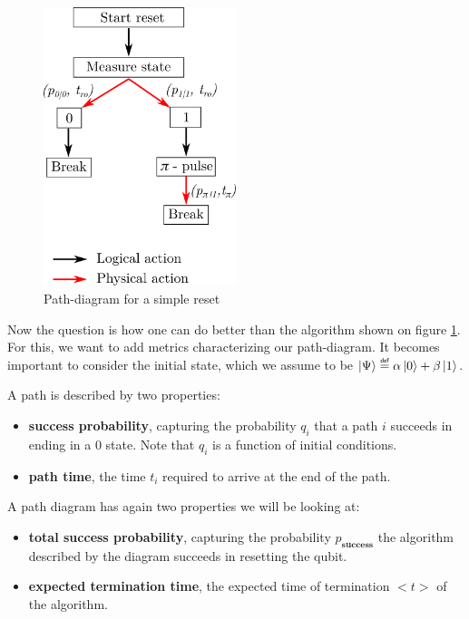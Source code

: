\begin{figure}[h]
    \centering
    \includegraphics[width=0.5\textwidth]{pic/algorithmic_reset/finite_branching.png}
    \caption{Path-diagram for a simple reset}
    \label{fig:finite_branching}
\end{figure}

Now the question is how one can do better than the algorithm shown on figure \ref{fig:finite_branching}. For this, we want to add metrics characterizing our path-diagram. It becomes important to consider the initial state, which we assume to be $\ket{\Psi} \eqdef \alpha\ket{0} + \beta \ket{1}$.

A path is described by two properties:
\begin{itemize}
    \item \textbf{success probability}, capturing the probability $q_i$ that a path $i$ succeeds in ending in a 0 state. Note that $q_i$ is a function of initial conditions.
    \item \textbf{path time}, the time $t_i$ required to arrive at the end of the path.
\end{itemize}

A path diagram has again two properties we will be looking at: 
\begin{itemize}
    \item \textbf{total success probability}, capturing the probability $p_\textbf{success}$ the algorithm described by the diagram succeeds in resetting the qubit. 
    \item \textbf{expected termination time}, the expected time of termination $<t>$ of the algorithm.
\end{itemize}

